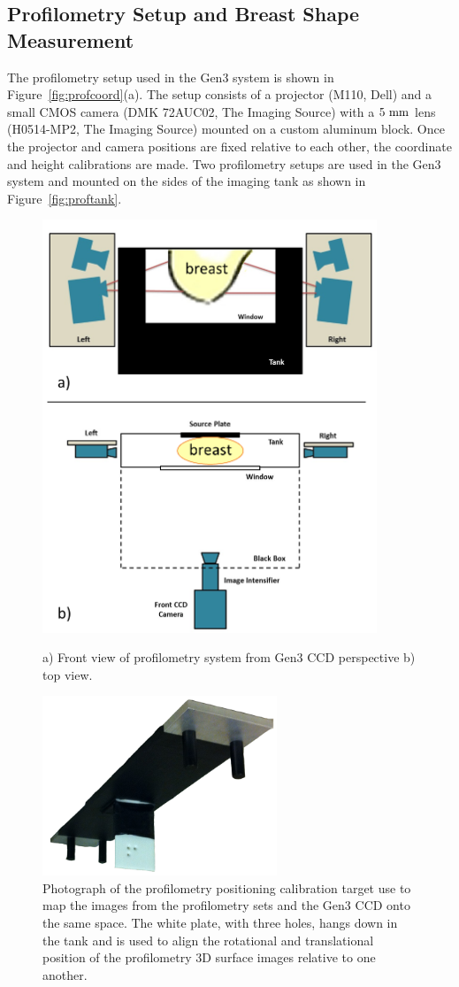 \subsection{Profilometry Setup and Breast Shape Measurement}
The profilometry setup used in the Gen3 system is shown in Figure~\ref{fig:profcoord}(a). The setup consists of a projector (M110, Dell) and a small CMOS camera (DMK 72AUC02, The Imaging Source)  with a $5~\rm{mm}$ lens (H0514-MP2, The Imaging Source) mounted on a custom aluminum block. Once the projector and camera positions are fixed relative to each other, the coordinate and height calibrations are made. Two profilometry setups are used in the Gen3 system and mounted on the sides of the imaging tank as shown in Figure~\ref{fig:proftank}.
\begin{figure}[ph]
\centering
\includegraphics[width=10cm]{./figures/4_Gen3/proftank.png}
\caption[Schematic of profilometry system relative to Gen3 imager]{a) Front view of profilometry system from Gen3 CCD perspective b) top view.}
\label{fig:proftank}
\vspace{5mm}
\includegraphics[width=7cm]{./figures/4_Gen3/profcalib.png}
\caption[Photograph of the profilometry positioning calibration target]{Photograph of the profilometry positioning calibration target use to map the images from the profilometry sets and the Gen3 CCD onto the same space. The white plate, with three holes, hangs down in the tank and is used to align the rotational and translational position of the profilometry 3D surface images relative to one another.}
\label{fig:profcalib}
\end{figure}

